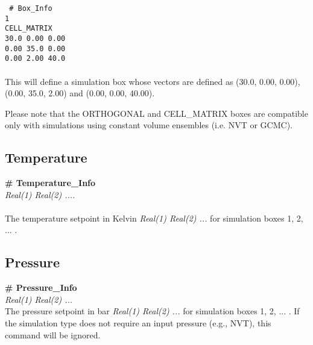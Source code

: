\texttt{
\# Box\_Info \\
 1 \\
 CELL\_MATRIX \\
 30.0 0.00 0.00\\
 0.00 35.0 0.00\\
 0.00 2.00 40.0}
\\ \\

This will define a simulation box whose vectors are defined as 
(30.0, 0.00, 0.00), (0.00, 35.0, 2.00) and (0.00, 0.00, 40.00).

Please note that the ORTHOGONAL and CELL\_MATRIX boxes are
compatible only with simulations using constant volume ensembles (i.e. 
NVT or GCMC).
%
%
%
%
%
\subsection{Temperature}\label{sec:Temperature_Info}
{\bf \# Temperature\_Info} \\ 
{\it Real(1) Real(2) .... } \\ \\
%
The temperature setpoint in Kelvin {\it Real(1) Real(2) ... } for simulation
boxes 1, 2, ... .
%
%
\subsection{Pressure}\label{sec:Pressure_Info}
{\bf \# Pressure\_Info} \\
{\it Real(1) Real(2) ... } \\
%
The pressure setpoint in bar {\it Real(1) Real(2) ...} for simulation
boxes 1, 2, ... . If the simulation type does not require an
input pressure (e.g., NVT), this command will be ignored.  
%
%

